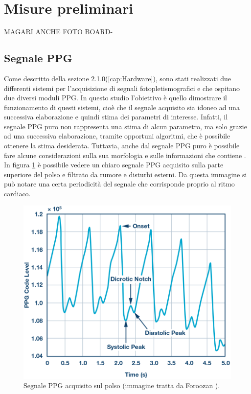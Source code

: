\section{Misure preliminari}
 MAGARI ANCHE FOTO BOARD-
\subsection{Segnale PPG}
Come descritto della sezione 2.1.0(\ref{cap:Hardware}), sono stati realizzati due differenti sistemi per l'acquisizione di segnali fotopletismografici e che ospitano due diversi moduli PPG. In questo studio l'obiettivo è quello dimostrare il funzionamento di questi sistemi, cioè che il segnale acquisito sia idoneo ad una successiva elaborazione e quindi stima dei parametri di interesse. Infatti, il segnale PPG puro non rappresenta una stima di alcun parametro, ma solo grazie ad una successiva elaborazione, tramite opportuni algoritmi, che è possibile ottenere la stima desiderata.
Tuttavia, anche dal segnale PPG puro è possibile fare alcune considerazioni sulla sua morfologia e sulle informazioni che contiene \cite{Foroozan2018}. In figura \ref{fig:Descrizione_Segnale_PPG} è possibile vedere un chiaro segnale PPG acquisito sulla parte superiore del polso e filtrato da rumore e disturbi esterni. Da questa immagine si può notare una certa periodicità del segnale che corrisponde proprio al ritmo cardiaco.
\begin{figure}[h]
	\centering
	\includegraphics[width=0.8\linewidth]{ImageFiles/Misure Preliminari/descrizione_segnale_ppg}
	\caption{Segnale PPG acquisito sul polso (immagine tratta da Foroozan \cite{Foroozan2018}).}
	\label{fig:Descrizione_Segnale_PPG}
\end{figure}
